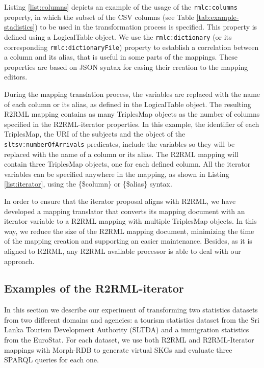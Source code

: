 Listing \ref{list:columns} depicts an example of the usage of the \texttt{rmlc:columns} property, in which the subset of the CSV columns (see Table \ref{tab:example-stadistics}) to be used in the transformation process is specified. This property is defined using a LogicalTable object. We use the \texttt{rmlc:dictionary} (or its corresponding \texttt{rmlc:dictionaryFile}) property to establish a correlation between a column and its alias, that is useful in some parts of the mappings. These properties are based on JSON syntax for easing their creation to the mapping editors.

During the mapping translation process, the variables are replaced with the name of each column or its alias, as defined in the LogicalTable object. The resulting R2RML mapping contains as many TriplesMap objects as the number of columns specified in the R2RML-iterator properties. In this example, the identifier of each TriplesMap, the URI of the subjects and the object of the \texttt{sltsv:numberOfArrivals} predicates, include the variables so they will be replaced with the name of a column or its alias. The R2RML mapping will contain three TriplesMap objects, one for each defined column. All the iterator variables can be specified anywhere in the mapping, as shown in Listing \ref{list:iterator}, using the \{\$column\} or \{\$alias\} syntax.

In order to ensure that the iterator proposal aligns with R2RML, we have developed a mapping translator that converts its mapping document with an iterator variable to a R2RML mapping with multiple TriplesMap objects. In this way, we reduce the size of the R2RML mapping document, minimizing the time of the mapping creation and supporting an easier maintenance. Besides, as it is aligned to R2RML, any R2RML available processor is able to deal with our approach. 

\subsection{Examples of the R2RML-iterator}
In this section we describe our experiment of transforming two statistics datasets from two different domains and agencies: a tourism statistics dataset from the Sri Lanka Tourism Development Authority (SLTDA) and a immigration statistics from the EuroStat. For each dataset, we use both R2RML and R2RML-Iterator mappings with Morph-RDB to generate virtual SKGs and evaluate three SPARQL queries for each one.

